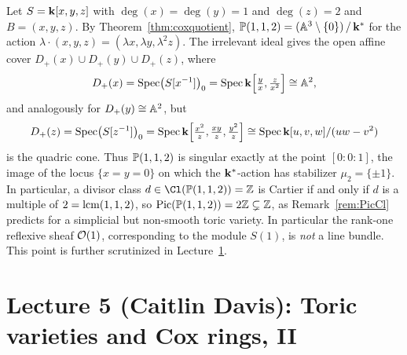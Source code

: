 \documentclass{amsart}
\begin{document}
\begin{example}[$\PP(1,1,2)$ in detail]\label{ex:P112charts}
  Let $S = {\bf k}[x,y,z]$ with $\deg(x)=\deg(y)=1$ and $\deg(z)=2$ and $B = (x,y,z)$. By Theorem~\ref{thm:coxquotient}, $\mathbb P(1,1,2) = (\mathbb A^3\setminus\{0\})\,/\,{\bf k}^*$ for the action $\lambda\cdot(x,y,z)=(\lambda x,\lambda y,\lambda^2 z)$. The irrelevant ideal gives the open affine cover $D_+(x)\cup D_+(y)\cup D_+(z)$, where
  \[ D_+(x) = \operatorname{Spec}\bigl(S[x^{-1}]\bigr)_0 = \operatorname{Spec} {\bf k}\Bigl[\tfrac{y}{x},\tfrac{z}{x^2}\Bigr]\cong\mathbb A^2, \]
  and analogously for $D_+(y)\cong\mathbb A^2$, but
  \[ D_+(z) = \operatorname{Spec}\bigl(S[z^{-1}]\bigr)_0 = \operatorname{Spec}{\bf k}\Bigl[\tfrac{x^2}{z},\tfrac{xy}{z},\tfrac{y^2}{z}\Bigr]\cong \operatorname{Spec} {\bf k}[u,v,w]/(uw-v^2) \]
  is the quadric cone. Thus $\PP(1,1,2)$ is singular exactly at the point $[0:0:1]$, the image of the locus $\{x=y=0\}$ on which the ${\bf k}^*$-action has stabilizer $\mu_2 = \{\pm1\}$. In particular, a divisor class $d\in\Cl(\PP(1,1,2)) = \ZZ$ is Cartier if and only if $d$ is a multiple of $2 = \operatorname{lcm}(1,1,2)$, so $\operatorname{Pic}(\mathbb P(1,1,2)) = 2\mathbb Z \subsetneq \mathbb Z$, as Remark~\ref{rem:PicCl} predicts for a simplicial but non-smooth toric variety. In particular the rank-one reflexive sheaf ${\mathcal O}(1)$, corresponding to the module $S(1)$, is \emph{not} a line bundle. This point is further scrutinized in Lecture~\ref{lec:5-toric-cox}.
\end{example}


\section{Lecture 5 (Caitlin Davis): Toric varieties and Cox rings, II}\label{lec:5-toric-cox}
\end{document}
